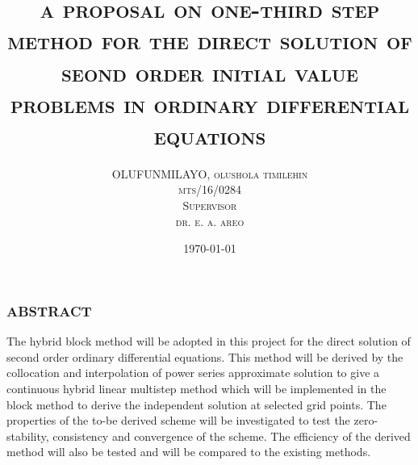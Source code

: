 \documentclass[compress, 19pt, blue]{beamer}
\title{\textsc{a proposal on one-third step method for the direct solution of seond order initial value problems in ordinary differential equations} }
\author{\textsc{OLUFUNMILAYO, olushola timilehin \\ mts/16/0284\\Supervisor\\dr. e. a. areo}}
\date{\today}
\begin{document}
	\begin{frame}
	\titlepage
\end{frame}
\begin{frame}
	\frametitle{\textbf{ABSTRACT}}
	\color{blue}
	\begin{center}
	The hybrid block method will be adopted in this project for the direct solution of second order ordinary differential equations. This method will be derived by the collocation and interpolation of power series approximate solution to give a continuous hybrid linear multistep method which will be implemented in the block method to derive the independent solution at selected grid points. The properties of the to-be derived scheme will be investigated to test the zero-stability, consistency and convergence of the scheme. The efficiency of the derived method will also be tested and will be compared to the existing methods.
	\end{center}
\end{frame}
	
\end{document}
